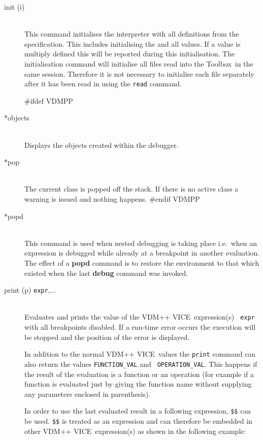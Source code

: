 \documentclass[\pformat,12pt]{article}
\newcommand{\vdmslpp}{VDM-SL}
\newcommand{\Toolbox}{Toolbox}
\newcommand{\vdmslpp}{VDM++}
\newcommand{\Toolbox}{Toolbox}
\renewcommand{\vdmslpp}{VDM++ VICE}
\begin{document}
\begin{description}
\item[init (i)] \mbox{}\\ This command initialises
  the interpreter with all definitions from the specification. This
  includes initialising the
   and all
  values. If a value is multiply defined this will be reported during
  this initialisation. The initialisation command will initialise all
  files read into the \Toolbox\ in the same session. Therefore it is
  not necessary to initialise each file separately after it has been
  read in using the {\tt read} command.

#ifdef VDMPP
\item[*objects] \mbox{}\\
  Displays the objects created within the debugger.
  
\item[*pop] \mbox{}\\
  The current class is popped off the stack. 
If there is no active class a warning is issued and
  nothing happens.
#endif VDMPP

\item[*popd] \mbox{}\\
  This command is used when nested debugging is taking place i.e.\ when
  an expression is debugged while already at a breakpoint in another
  evaluation. The effect of a
  \textbf{popd} command is to restore the environment to that which
  existed when the last \textbf{debug} command was invoked.
 
\item[print (p) {\tt expr},...] \mbox{}\\
  Evaluates and prints the value of the \vdmslpp\ expression(s) {\tt
    expr} with all breakpoints disabled. If a run-time error occurs
  the execution will be stopped and the position of the error is
  displayed.

  In addition to the normal \vdmslpp\ values the {\tt print} command
  can also return the values {\tt FUNCTION\_VAL} and {\tt
    OPERATION\_VAL}\@.  This happens if the result of the evaluation is
  a function or an operation (for example if a function
  is evaluated just by giving the function name without supplying any
  parameters enclosed in parenthesis).
  
  In order to use the last evaluated result in a following expression,
  {\tt \$\$} can be used.  {\tt \$\$} is treated as an expression and
  can therefore be embedded in other \vdmslpp\ expression(s) as shown
  in the following   example:


\end{description}
\end{document}
